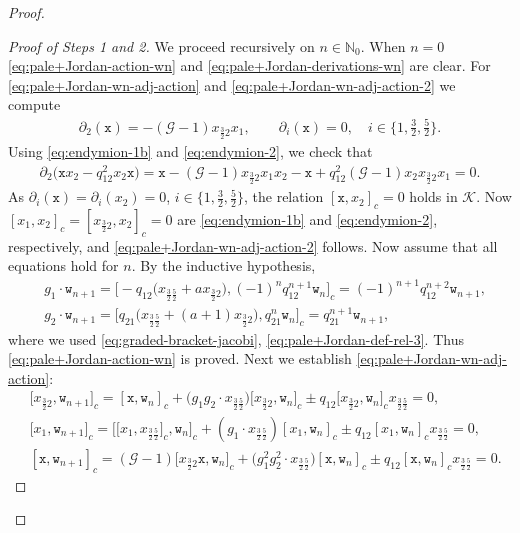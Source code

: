 \documentclass[pdftex]{sigma}
\numberwithin{equation}{section}
\newcommand{\ghost}{\mathscr{G}}
\newcommand{\K}{{\mathcal{K}}}
\newcommand{\N}{{\mathbb N}}
\newcommand{\wt}{\mathtt{w}}
\newcommand{\xt}{\mathtt{x}}
\newcommand{\tresdos}{\frac{3}{2}}
\newcommand{\cincodos}{\frac{5}{2}}
\begin{document}
\begin{proof}
\begin{proof}[Proof of Steps 1 and 2]
We proceed recursively on $n\in\N_0$.
When $n=0$ \eqref{eq:pale+Jordan-action-wn} and \eqref{eq:pale+Jordan-derivations-wn} are clear. For \eqref{eq:pale+Jordan-wn-adj-action} and \eqref{eq:pale+Jordan-wn-adj-action-2} we compute
\begin{align*}%
\partial_2(\xt) = -(\ghost-1)x_{\tresdos2}x_1, \qquad
\partial_i(\xt) = 0, \quad i\in\big\{1,\tfrac{3}{2},\tfrac{5}{2}\big\}.
\end{align*}
Using \eqref{eq:endymion-1b} and \eqref{eq:endymion-2}, we check that
\begin{align*}
\partial_2 \big(\xt x_2-q_{12}^2 x_2\xt\big) = \xt -(\ghost-1)x_{\tresdos2}x_1 x_2 -\xt +q_{12}^2(\ghost-1) x_2x_{\tresdos2}x_1=0.
\end{align*}
As $\partial_i(\xt) = \partial_i(x_2) = 0$, $i\in\{1,\tresdos,\cincodos\}$, the relation
$[\xt, x_2]_c=0$ holds in $\K$. Now $[x_1,x_2]_c=[x_{\tresdos2},x_2]_c=0$ are \eqref{eq:endymion-1b} and \eqref{eq:endymion-2}, respectively, and \eqref{eq:pale+Jordan-wn-adj-action-2} follows.
Now assume that all equations hold for $n$. By the inductive hypothesis,
\begin{align*}
&g_1\cdot \wt_{n+1} = \bigl[-q_{12}\big(x_{\tresdos\cincodos}+ax_{\tresdos2}\big), (-1)^n q_{12}^{n+1} \wt_n\big]_c =(-1)^{n+1} q_{12}^{n+2} \wt_{n+1},
\\
&g_2\cdot \wt_{n+1} = \big[q_{21}\big(x_{\tresdos\cincodos}+(a+1)x_{\tresdos2}\big), q_{21}^{n} \wt_n\big]_c = q_{21}^{n+1} \wt_{n+1},
\end{align*}
where we used \eqref{eq:graded-bracket-jacobi}, \eqref{eq:pale+Jordan-def-rel-3}. Thus \eqref{eq:pale+Jordan-action-wn} is proved.
Next we establish \eqref{eq:pale+Jordan-wn-adj-action}:
\begin{align*}
&\big[x_{\tresdos2},\wt_{n+1}\big]_c = [\xt,\wt_n]_c +\big(g_1g_2 \cdot x_{\tresdos\cincodos}\big)\big[x_{\tresdos2},\wt_n\big]_c \pm q_{12} \big[x_{\tresdos2},\wt_n\big]_c x_{\tresdos\cincodos}=0,
\\
&\big[x_1,\wt_{n+1}\big]_c = \big[\big[x_1,x_{\tresdos\cincodos}\big]_c,\wt_n\big]_c +(g_1 \cdot x_{\tresdos\cincodos})[x_1,\wt_n]_c \pm q_{12} [x_1,\wt_n]_c x_{\tresdos\cincodos}=0,
\\
&[\xt,\wt_{n+1}]_c = (\ghost-1)\big[x_{\tresdos2}\xt,\wt_n\big]_c +\big(g_1^2g_2^2 \cdot x_{\tresdos\cincodos}\big)[\xt,\wt_n]_c \pm q_{12} [\xt,\wt_n]_c x_{\tresdos\cincodos}=0.
\end{align*}

\end{proof}
\end{proof}
\end{document}
